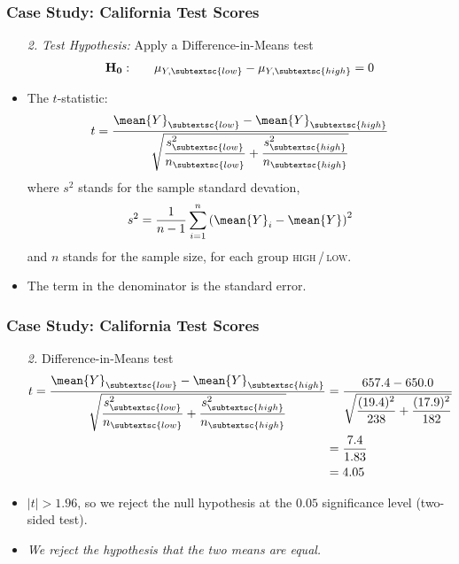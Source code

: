\begin{frame}
\frametitle{Case Study: California Test Scores}
\begin{itemize}
\item[\emph{2.}] \emph{Test Hypothesis:} 
\smallskip\newlineqquad Apply a Difference-in-Means test
\begin{align*}
\mathbf{H_{0}:} \qquad \mu_{Y,\subtextsc{low}}-\mu_{Y,\subtextsc{high}} = 0
\end{align*}
\item The $t$-statistic:
\begin{align*}
t = \dfrac{\mean{Y}_{\subtextsc{low}}-\mean{Y}_{\subtextsc{high}}}{\sqrt{\dfrac{s^2_{\subtextsc{low}}}{n_{\subtextsc{low}}}+\dfrac{s^2_{\subtextsc{high}}}{n_{\subtextsc{high}}}}}
\end{align*}
where $s^2$ stands for the sample standard devation,
\begin{align*}
s^2 = \frac{1}{n-1} \sum_{i=1}^{n} \left(\mean{Y}_{i}-\mean{Y}\right)^2
\end{align*}
and $n$ stands for the sample size, for each group \textsc{high}\,/\,\textsc{low}.
\item The term in the denominator is the standard error.
\end{itemize}
\end{frame}


\begin{frame}
\frametitle{Case Study: California Test Scores}
\begin{itemize}
\item[\emph{2.}] Difference-in-Means test  
\begin{align*}
t = \frac{\mean{Y}_{\subtextsc{low}}-\mean{Y}_{\subtextsc{high}}}{\sqrt{\dfrac{s^2_{\subtextsc{low}}}{n_{\subtextsc{low}}}+\dfrac{s^2_{\subtextsc{high}}}{n_{\subtextsc{high}}}}}
& = 
\frac{657.4-650.0}{\sqrt{\dfrac{(19.4)^2}{238}+\dfrac{(17.9)^2}{182}}} \\
& = \frac{7.4}{1.83} \\
& = 4.05
\end{align*}
\item $|t| > 1.96$, so we reject the null hypothesis at the $0.05$ significance level (two-sided test). 
\item \emph{We reject the hypothesis that the two means are equal.}
\end{itemize}
\end{frame}


